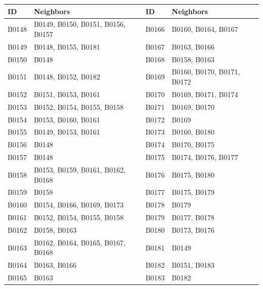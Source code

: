 \begin{tabular}{@{}llll@{}}
\toprule
ID & Neighbors & ID & Neighbors\\
\midrule
B0148 & B0149, B0150, B0151, B0156, B0157 & B0166 & B0160, B0164, B0167\\
B0149 & B0148, B0155, B0181 & B0167 & B0163, B0166\\
B0150 & B0148 & B0168 & B0158, B0163\\
B0151 & B0148, B0152, B0182 & B0169 & B0160, B0170, B0171, B0172\\
B0152 & B0151, B0153, B0161 & B0170 & B0169, B0171, B0174\\
B0153 & B0152, B0154, B0155, B0158 & B0171 & B0169, B0170\\
B0154 & B0153, B0160, B0161 & B0172 & B0169\\
B0155 & B0149, B0153, B0161 & B0173 & B0160, B0180\\
B0156 & B0148 & B0174 & B0170, B0175\\
B0157 & B0148 & B0175 & B0174, B0176, B0177\\
B0158 & B0153, B0159, B0161, B0162, B0168 & B0176 & B0175, B0180\\
B0159 & B0158 & B0177 & B0175, B0179\\
B0160 & B0154, B0166, B0169, B0173 & B0178 & B0179\\
B0161 & B0152, B0154, B0155, B0158 & B0179 & B0177, B0178\\
B0162 & B0158, B0163 & B0180 & B0173, B0176\\
B0163 & B0162, B0164, B0165, B0167, B0168 & B0181 & B0149\\
B0164 & B0163, B0166 & B0182 & B0151, B0183\\
B0165 & B0163 & B0183 & B0182\\
\bottomrule
\end{tabular}
